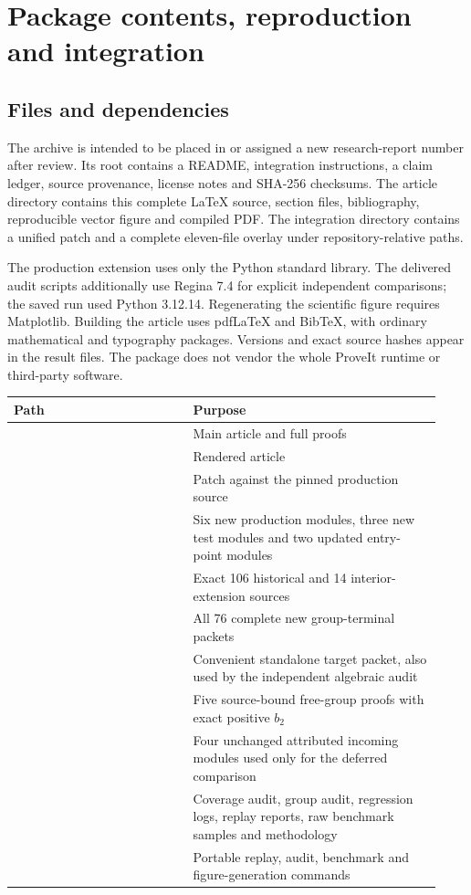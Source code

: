 \section{Package contents, reproduction and integration}
\label{sec:reproduction}

\subsection{Files and dependencies}

The archive is intended to be placed in  or assigned a new
research-report number after review. Its root contains a README, integration
instructions, a claim ledger, source provenance, license notes and SHA-256
checksums. The article directory contains this complete \LaTeX{} source,
section files, bibliography, reproducible vector figure and compiled PDF.
The integration directory contains a unified patch and a complete eleven-file
overlay under repository-relative paths.

The production extension uses only the Python standard library. The delivered
audit scripts additionally use Regina 7.4 for explicit independent comparisons;
the saved run used Python 3.12.14. Regenerating the scientific figure requires
Matplotlib. Building the article uses pdf\LaTeX{} and BibTeX, with ordinary
mathematical and typography packages. Versions and exact source hashes appear
in the result files. The package does not vendor the whole ProveIt runtime or
third-party software.

\begin{longtable}{P{0.39\linewidth}P{0.54\linewidth}}
\toprule
Path & Purpose \\
\midrule
\endhead
{} & Main article and full proofs \\
 & Rendered article \\
 & Patch against the pinned production source \\
 & Six new production modules, three new test modules and two updated entry-point modules \\
 & Exact 106 historical and 14 interior-extension sources \\
 & All 76 complete new group-terminal packets \\
 & Convenient standalone target packet, also used by the independent algebraic audit \\
 & Five source-bound free-group proofs with exact positive $b_2$ \\
 & Four unchanged attributed incoming modules used only for the deferred comparison \\
 & Coverage audit, group audit, regression logs, replay reports, raw benchmark samples and methodology \\
 & Portable replay, audit, benchmark and figure-generation commands \\
\bottomrule
\end{longtable}

